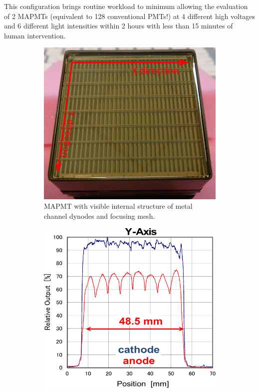 \documentclass[5p,times,preprint]{elsarticle}
\begin{document}
This configuration brings routine workload to minimum allowing the evaluation of 2 MAPMTs (equivalent to 128 conventional PMTs!) at 4 different high voltages and 6 different light intensities within 2 hours with less than 15 minutes of human intervention.

\begin{figure}[b]
	\centering
	\begin{subfigure}{0.3\linewidth}
		\includegraphics[width=\textwidth]{surfaceuniform1.pdf}
		\caption{MAPMT with visible internal structure of metal channel dynodes and focusing mesh.}
		\label{fig:surfaceuniform1}
	\end{subfigure}
	\quad
	\begin{subfigure}{0.3\linewidth}
		\includegraphics[width=\textwidth]{surfaceuniform3.pdf}

\end{subfigure}
\end{figure}
\end{document}
